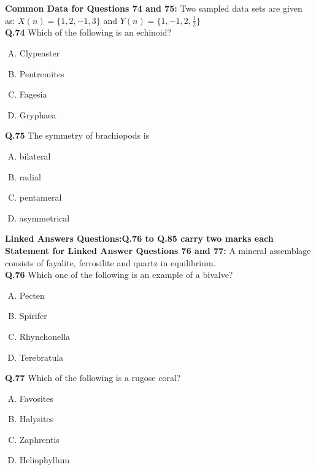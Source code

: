 \noindent\textbf{Common Data for Questions 74 and 75:} Two sampled data sets are given as: \( X(n) = \{1, 2, -1, 3\} \) and \( Y(n) = \{1, -1, 2, \tfrac{1}{2} \} \)\\

\textbf{Q.74} Which of the following is an echinoid?
\begin{enumerate}[(A)]
    \item Clypeaster
    \item Pentremites
    \item Fagesia
    \item Gryphaea
\end{enumerate}

\textbf{Q.75} The symmetry of brachiopods is
\begin{enumerate}[(A)]
    \item bilateral
    \item radial
    \item pentameral
    \item asymmetrical
\end{enumerate}
\textbf{Linked Answers Questions:Q.76 to Q.85 carry two marks each}\\

\noindent\textbf{Statement for Linked Answer Questions 76 and 77:}  A mineral assemblage consists of fayalite, ferrosilite and quartz in equilibrium. \\


\textbf{Q.76} Which one of the following is an example of a bivalve?
\begin{enumerate}[(A)]
    \item Pecten
    \item Spirifer
    \item Rhynchonella
    \item Terebratula
\end{enumerate}

\textbf{Q.77} Which of the following is a rugose coral?
\begin{multicols}{4}
    

\begin{enumerate}[(A)]
    \item Favosites
    \item Halysites
    \item Zaphrentis
    \item Heliophyllum
\end{enumerate}
\end{multicols}

